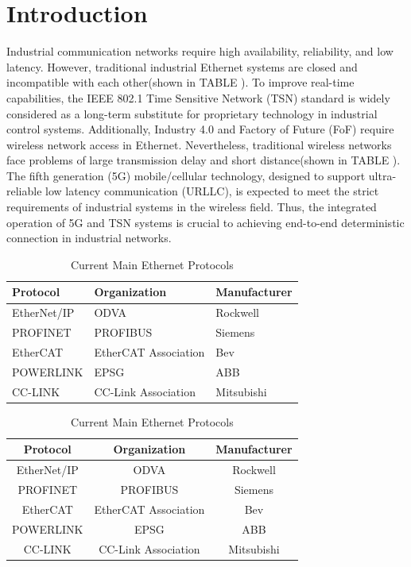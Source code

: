 \documentclass[english]{cccconf}
\begin{document}
\section{Introduction}
Industrial communication networks require high availability, reliability, and low latency. However, traditional industrial Ethernet systems are closed and incompatible with each other(shown in TABLE \uppercase\expandafter{}). To improve real-time capabilities, the IEEE 802.1 Time Sensitive Network (TSN) standard is widely considered as a long-term substitute for proprietary technology in industrial control systems. Additionally, Industry 4.0 and Factory of Future (FoF) require wireless network access in Ethernet. Nevertheless, traditional wireless networks face problems of large transmission delay and short distance\cite{2013Recommendations}(shown in TABLE \uppercase\expandafter{}). The fifth generation (5G) mobile/cellular technology, designed to support ultra-reliable low latency communication (URLLC), is expected to meet the strict requirements of industrial systems in the wireless field. Thus, the integrated operation of 5G and TSN systems is crucial to achieving end-to-end deterministic connection in industrial networks.
\begin{table}[!htb]
	\centering
	\caption{Current Main Ethernet Protocols}
	\label{tab1}
	\begin{tabular}{l|l|l}
			\hline
\textbf{Protocol}& \textbf{Organization}& \textbf{Manufacturer} \\
\hline
EtherNet/IP
& ODVA
& Rockwell \\
\hline
PROFINET
& PROFIBUS
& Siemens \\
\hline
EtherCAT
& EtherCAT Association
& Bev \\
\hline
POWERLINK
& EPSG
& ABB \\
\hline
CC-LINK
& CC-Link Association
& Mitsubishi \\
\hline
	\end{tabular}
\end{table}
\begin{table}[htbp]
	\caption{Current Main Ethernet Protocols}
	\begin{center}
		\begin{tabular}{|c|c|c|}
			\hline
			\textbf{Protocol}& \textbf{Organization}& \textbf{Manufacturer} \\
			\hline
			EtherNet/IP
			& ODVA
			& Rockwell \\
			\hline
			PROFINET
			& PROFIBUS
			& Siemens \\
			\hline
			EtherCAT
			& EtherCAT Association
			& Bev \\
			\hline
			POWERLINK
			& EPSG
			& ABB \\
			\hline
			CC-LINK
			& CC-Link Association
			& Mitsubishi \\
			\hline 						
		\end{tabular}
		\label{tab1}
	\end{center}
\end{table}
\end{document}
